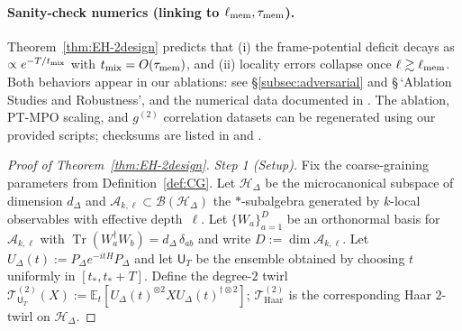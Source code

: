 \documentclass[a4paper,11pt]{article}
\let\mathscr\mathcal
\newcommand{\Tr}{\operatorname{Tr}}
\theoremstyle{plain}
\theoremstyle{definition}
\theoremstyle{remark}
\begin{document}
\paragraph{Sanity-check numerics (linking to $\ell_{\rm mem},\tau_{\rm mem}$).}
Theorem~\ref{thm:EH-2design} predicts that (i) the frame-potential deficit decays as $\propto e^{-T/t_{\rm mix}}$ with $t_{\rm mix}=O(\tau_{\rm mem})$, and (ii) locality errors collapse once $\ell\gtrsim\ell_{\rm mem}$.
Both behaviors appear in our ablations: see \S\ref{subsec:adversarial} and \S\,`Ablation Studies and Robustness', and the numerical data documented in .
The ablation, PT-MPO scaling, and $g^{(2)}$ correlation datasets can be regenerated using our provided scripts;
checksums are listed in  and .
\begin{proof}[Proof of Theorem~\ref{thm:EH-2design}]
\emph{Step 1 (Setup).} Fix the coarse-graining parameters from Definition~\ref{def:CG}. Let $\mathcal{H}_\Delta$
be the microcanonical subspace of dimension $d_\Delta$ and $\mathscr{A}_{k,\ell}\subset\mathcal{B}(\mathcal{H}_\Delta)$ the
$*$-subalgebra generated by $k$-local observables with effective depth~$\ell$. Let $\{W_a\}_{a=1}^{D}$ be an orthonormal basis
for $\mathscr{A}_{k,\ell}$ with $\Tr(W_a^\dagger W_b)=d_\Delta\,\delta_{ab}$ and write $D:=\dim\mathscr{A}_{k,\ell}$.
Let $U_\Delta(t):=P_\Delta e^{-itH}P_\Delta$ and let $\mathsf{U}_T$ be the ensemble obtained by choosing $t$ uniformly
in $[t_\ast,t_\ast+T]$. Define the degree-$2$ twirl
$\mathcal{T}^{(2)}_{\mathsf{U}_T}(X):=\mathbb{E}_{t}\!\left[U_\Delta(t)^{\otimes2} X U_\Delta(t)^{\dagger\otimes2}\right]$;
$\mathcal{T}^{(2)}_{\mathrm{Haar}}$ is the corresponding Haar $2$-twirl on $\mathcal{H}_\Delta$.


\end{proof}
\end{document}
